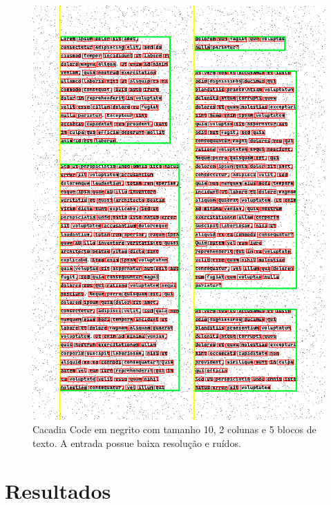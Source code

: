 \documentclass[english, 
               brazil, 
               bsc] %
               {dcomp-abntex2}
\begin{document}
\begin{figure}[h]
        \caption{\label{cascadia} \small Cacadia Code em negrito com tamanho 10, 2 colunas e 5 blocos de texto. A entrada possue baixa resolução e ruídos. }
        \begin{center}
            \includegraphics[scale=0.5]{./images/cascadia_code_10_detected_colunas_2_blocos_5_linhas_42_palavras_395.png}
        \end{center}
\end{figure}



\section{Resultados}
\end{document}
